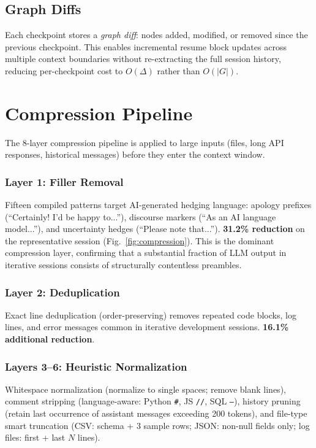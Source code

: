 \documentclass[journal]{IEEEtran}
\begin{document}
\subsection{Graph Diffs}

Each checkpoint stores a \emph{graph diff}: nodes added,
modified, or removed since the previous checkpoint.
This enables incremental resume block updates across
multiple context boundaries without re-extracting the full
session history, reducing per-checkpoint cost to $O(\Delta)$
rather than $O(|G|)$.

\section{Compression Pipeline}
\label{sec:compression}

The 8-layer compression pipeline is applied to large inputs
(files, long API responses, historical messages) before they
enter the context window.

\subsubsection{Layer 1: Filler Removal}
Fifteen compiled patterns target AI-generated hedging
language: apology prefixes (``Certainly! I'd be happy to...''),
discourse markers (``As an AI language model...''), and
uncertainty hedges (``Please note that...'').
\textbf{31.2\% reduction} on the representative session
(Fig.~\ref{fig:compression}).
This is the dominant compression layer, confirming that a
substantial fraction of LLM output in iterative sessions
consists of structurally contentless preambles.

\subsubsection{Layer 2: Deduplication}
Exact line deduplication (order-preserving) removes repeated
code blocks, log lines, and error messages common in
iterative development sessions.
\textbf{16.1\% additional reduction}.

\subsubsection{Layers 3--6: Heuristic Normalization}
Whitespace normalization (normalize to single spaces; remove
blank lines), comment stripping (language-aware: Python
\texttt{\#}, JS \texttt{//}, SQL \texttt{--}),
history pruning (retain last occurrence of assistant messages
exceeding 200 tokens), and file-type smart truncation
(CSV: schema + 3 sample rows; JSON: non-null fields only;
log files: first + last $N$ lines).
\end{document}
